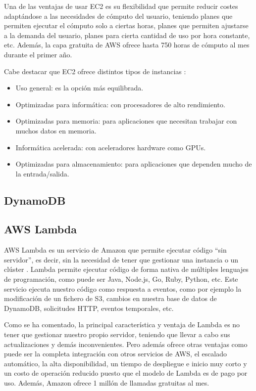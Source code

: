 Una de las ventajas de usar EC2 es su flexibilidad que permite reducir costes adaptándose a las necesidades de cómputo del usuario, teniendo planes que permiten ejecutar el cómputo solo a ciertas horas, planes que permiten ajustarse a la demanda del usuario, planes para cierta cantidad de uso por hora constante, etc. Además, la capa gratuita de AWS ofrece hasta 750 horas de cómputo al mes durante el primer año.

Cabe destacar que EC2 ofrece distintos tipos de instancias \cite{ec2_instances}:
\begin{itemize}
    \item Uso general: es la opción más equilibrada.
    \item Optimizadas para informática: con procesadores de alto rendimiento.
    \item Optimizadas para memoria: para aplicaciones que necesitan trabajar con muchos datos en memoria.
    \item Informática acelerada: con aceleradores hardware como GPUs.
    \item Optimizadas para almacenamiento: para aplicaciones que dependen mucho de la entrada/salida.
\end{itemize}

\subsection{DynamoDB}

\subsection{AWS Lambda}

AWS Lambda es un servicio de Amazon que permite ejecutar código ``sin servidor'', es decir, sin la necesidad de tener que gestionar una instancia o un clúster \cite{aws_lambda}. Lambda permite ejecutar código de forma nativa de múltiples lenguajes de programación, como puede ser Java, Node.js, Go, Ruby, Python, etc. Este servicio ejecuta nuestro código como respuesta a eventos, como por ejemplo la modificación de un fichero de S3, cambios en nuestra base de datos de DynamoDB, solicitudes HTTP, eventos temporales, etc. 

Como se ha comentado, la principal característica y ventaja de Lambda es no tener que gestionar nuestro propio servidor, teniendo que llevar a cabo sus actualizaciones y demás inconvenientes. Pero además ofrece otras ventajas como puede ser la completa integración con otros servicios de AWS, el escalado automático, la alta disponibilidad, un tiempo de despliegue e inicio muy corto y un costo de operación reducido puesto que el modelo de Lambda es de pago por uso. Además, Amazon ofrece 1 millón de llamadas gratuitas al mes.

